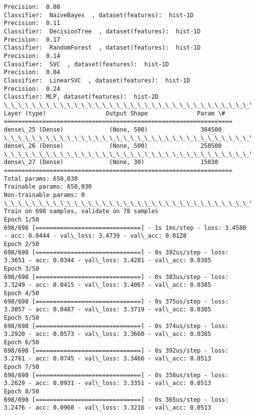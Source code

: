 \documentclass[11pt]{article}
\begin{document}
    \begin{Verbatim}[commandchars=\\\{\}]
Precision:  0.08
Classifier:  NaiveBayes  , dataset(features):  hist-1D
Precision:  0.11
Classifier:  DecisionTree  , dataset(features):  hist-1D
Precision:  0.17
Classifier:  RandomForest  , dataset(features):  hist-1D
Precision:  0.14
Classifier:  SVC  , dataset(features):  hist-1D
Precision:  0.04
Classifier:  LinearSVC  , dataset(features):  hist-1D
Precision:  0.24
Classifier: MLP, dataset(features):  hist-2D
\_\_\_\_\_\_\_\_\_\_\_\_\_\_\_\_\_\_\_\_\_\_\_\_\_\_\_\_\_\_\_\_\_\_\_\_\_\_\_\_\_\_\_\_\_\_\_\_\_\_\_\_\_\_\_\_\_\_\_\_\_\_\_\_\_
Layer (type)                 Output Shape              Param \#   
=================================================================
dense\_25 (Dense)             (None, 500)               384500    
\_\_\_\_\_\_\_\_\_\_\_\_\_\_\_\_\_\_\_\_\_\_\_\_\_\_\_\_\_\_\_\_\_\_\_\_\_\_\_\_\_\_\_\_\_\_\_\_\_\_\_\_\_\_\_\_\_\_\_\_\_\_\_\_\_
dense\_26 (Dense)             (None, 500)               250500    
\_\_\_\_\_\_\_\_\_\_\_\_\_\_\_\_\_\_\_\_\_\_\_\_\_\_\_\_\_\_\_\_\_\_\_\_\_\_\_\_\_\_\_\_\_\_\_\_\_\_\_\_\_\_\_\_\_\_\_\_\_\_\_\_\_
dense\_27 (Dense)             (None, 30)                15030     
=================================================================
Total params: 650,030
Trainable params: 650,030
Non-trainable params: 0
\_\_\_\_\_\_\_\_\_\_\_\_\_\_\_\_\_\_\_\_\_\_\_\_\_\_\_\_\_\_\_\_\_\_\_\_\_\_\_\_\_\_\_\_\_\_\_\_\_\_\_\_\_\_\_\_\_\_\_\_\_\_\_\_\_
Train on 698 samples, validate on 78 samples
Epoch 1/50
698/698 [==============================] - 1s 1ms/step - loss: 3.4580 - acc: 0.0444 - val\_loss: 3.4739 - val\_acc: 0.0128
Epoch 2/50
698/698 [==============================] - 0s 392us/step - loss: 3.3651 - acc: 0.0344 - val\_loss: 3.4281 - val\_acc: 0.0385
Epoch 3/50
698/698 [==============================] - 0s 383us/step - loss: 3.3249 - acc: 0.0415 - val\_loss: 3.4067 - val\_acc: 0.0385
Epoch 4/50
698/698 [==============================] - 0s 375us/step - loss: 3.3057 - acc: 0.0487 - val\_loss: 3.3719 - val\_acc: 0.0385
Epoch 5/50
698/698 [==============================] - 0s 374us/step - loss: 3.2920 - acc: 0.0573 - val\_loss: 3.3660 - val\_acc: 0.0385
Epoch 6/50
698/698 [==============================] - 0s 392us/step - loss: 3.2761 - acc: 0.0745 - val\_loss: 3.3466 - val\_acc: 0.0513
Epoch 7/50
698/698 [==============================] - 0s 358us/step - loss: 3.2629 - acc: 0.0931 - val\_loss: 3.3351 - val\_acc: 0.0513
Epoch 8/50
698/698 [==============================] - 0s 365us/step - loss: 3.2476 - acc: 0.0960 - val\_loss: 3.3216 - val\_acc: 0.0513

\end{Verbatim}
\end{document}
